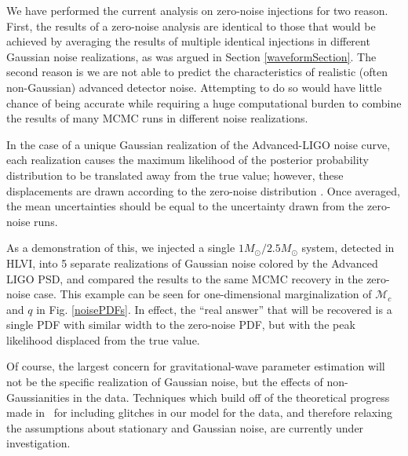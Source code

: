 \documentclass[11pt,a4paper]{emulateapj}
\newcommand{\chmass}{\mathcal{M}_c}
\begin{document}
  

We have performed the current analysis on zero-noise injections for two reason.  First, the results of a zero-noise 
analysis are identical to those that would be achieved by averaging the results of multiple identical injections 
in different Gaussian noise realizations, as was argued in Section \ref{waveformSection}.  The second reason is 
we are not able to predict the characteristics of realistic (often non-Gaussian) advanced detector noise.  
Attempting to do so would have little chance of being accurate while requiring a huge computational 
burden to combine the results of many MCMC runs in different noise realizations.

 In the case of a unique Gaussian realization
of the Advanced-LIGO noise curve, each realization causes the maximum likelihood of the posterior probability 
distribution to be translated away from the true value; however, these displacements are drawn
according to the zero-noise distribution \citep{Inadequacies}.  Once averaged, the mean
uncertainties should be equal to the uncertainty drawn from the zero-noise runs.  

As a demonstration of this, we injected a single $1M_{\odot}/2.5M_{\odot}$ system, 
detected in HLVI,  into 5 separate realizations of Gaussian noise colored by the Advanced LIGO PSD, 
and compared the results to the same MCMC recovery in the zero-noise case.  This example
can be seen for one-dimensional marginalization of $\chmass$ and $q$ in Fig. \ref{noisePDFs}.  In effect, the ``real answer'' that will be recovered is a single PDF with similar 
width to the zero-noise PDF, but with the peak likelihood displaced from the true value.  

Of course, the largest concern for gravitational-wave parameter estimation will not be the specific
realization of Gaussian noise, but the effects of non-Gaussianities in the data.  Techniques which build
 off of the theoretical progress made in~\cite{Allen:2002jw,Rover:2011qd,Littenberg:2010gf} for including
  glitches in our model for the data, and therefore relaxing the assumptions about stationary and Gaussian
   noise, are currently under investigation.
\end{document}
